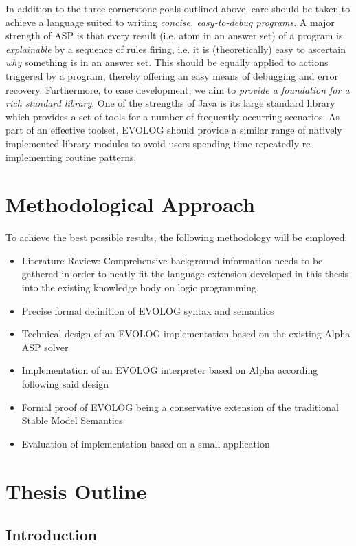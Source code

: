 \documentclass[12pt, letterpaper, twoside]{scrartcl}
\begin{document}
In addition to the three cornerstone goals outlined above, care should be taken to achieve a language suited to writing \emph{concise, easy-to-debug programs}. A major strength of ASP is that every result (i.e. atom in an answer set) of a program is \emph{explainable} by a sequence of rules firing, i.e. it is (theoretically) easy to ascertain \emph{why} something is in an answer set. This should be equally applied to actions triggered by a program, thereby offering an easy means of debugging and error recovery. Furthermore, to ease development, we aim to \emph{provide a foundation for a rich standard library}. One of the strengths of Java is its large standard library which provides a set of tools for a number of frequently occurring scenarios. As part of an effective toolset, EVOLOG should provide a similar range of natively implemented library modules to avoid users spending time repeatedly re-implementing routine patterns.

\section{Methodological Approach}
\label{sec:methodology}

To achieve the best possible results, the following methodology will be employed:
\begin{itemize}
\item Literature Review: Comprehensive background information needs to be gathered in order to neatly fit the language extension developed in this thesis into the existing knowledge body on logic programming.
\item Precise formal definition of EVOLOG syntax and semantics
\item Technical design of an EVOLOG implementation based on the existing Alpha ASP solver
\item Implementation of an EVOLOG interpreter based on Alpha according following said design
\item Formal proof of EVOLOG being a conservative extension of the traditional Stable Model Semantics
\item Evaluation of implementation based on a small application
\end{itemize}

\section{Thesis Outline}
\label{sec:outline}

\subsection{Introduction}
\end{document}
